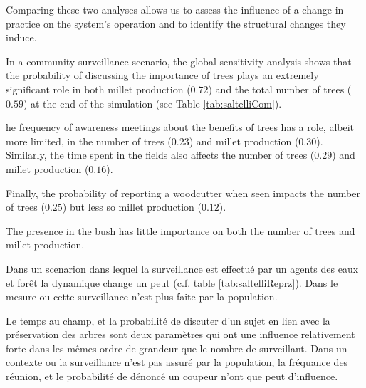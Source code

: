 \documentclass{article}
\begin{document}
    Comparing these two analyses allows us to assess the influence of a change in practice on the system's operation and to identify the structural changes they induce.

    In a community surveillance scenario, the global sensitivity analysis shows that the probability of discussing the importance of trees plays an extremely significant role in both millet production ($0.72$) and the total number of trees ($0.59$) at the end of the simulation (see Table \ref{tab:saltelliCom}).

    he frequency of awareness meetings about the benefits of trees has a role, albeit more limited, in the number of trees ($0.23$) and millet production ($0.30$). Similarly, the time spent in the fields also affects the number of trees ($0.29$) and millet production ($0.16$).

    Finally, the probability of reporting a woodcutter when seen impacts the number of trees ($0.25$) but less so millet production ($0.12$).

    The presence in the bush has little importance on both the number of trees and millet production.

    Dans un scenarion dans lequel la surveillance est effectué par un agents des eaux et forêt la dynamique change un peut (c.f. table \ref{tab:saltelliReprz}). Dans le mesure ou cette surveillance n'est plus faite par la population. 

    Le temps au champ, et la probabilité de discuter d'un sujet en lien avec la préservation des arbres sont deux paramètres qui ont une influence relativement forte dans les mêmes ordre de grandeur que le nombre de surveillant. Dans un contexte ou la surveillance n'est pas assuré par la population, la fréquance des réunion, et le probabilité de dénoncé un coupeur n'ont que peut d'influence.
    
\end{document}
